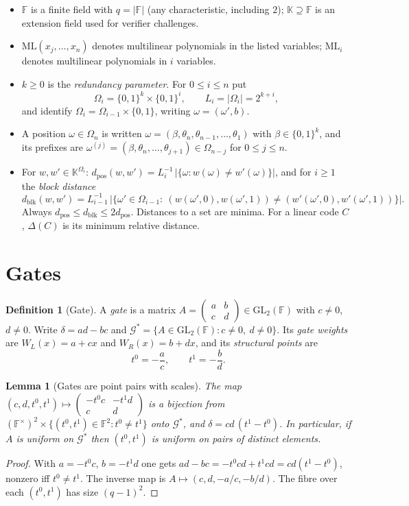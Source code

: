 \documentclass[11pt]{article}
\newtheorem{lemma}[theorem]{Lemma}
\theoremstyle{definition}
\newtheorem{definition}[theorem]{Definition}
\newcommand{\F}{\mathbb{F}}
\newcommand{\K}{\mathbb{K}}
\newcommand{\ML}{\mathrm{ML}}
\newcommand{\dpos}{d_{\mathrm{pos}}}
\newcommand{\dblk}{d_{\mathrm{blk}}}
\newcommand{\GL}{\mathrm{GL}}
\newcommand{\Gs}{\mathcal{G}^{*}}
\begin{document}
\begin{itemize}[leftmargin=*]
\item $\F$ is a finite field with $q=|\F|$ (any characteristic, including $2$); $\K\supseteq\F$ is an
extension field used for verifier challenges.
\item $\ML(x_j,\dots,x_n)$ denotes multilinear polynomials in the listed variables;
$\ML_i$ denotes multilinear polynomials in $i$ variables.
\item $k\ge 0$ is the \emph{redundancy parameter}. For $0\le i\le n$ put
\[
\Omega_i=\{0,1\}^k\times\{0,1\}^{i},\qquad L_i=|\Omega_i|=2^{k+i},
\]
and identify $\Omega_i=\Omega_{i-1}\times\{0,1\}$, writing $\omega=(\omega',b)$.
\item A position $\omega\in\Omega_n$ is written $\omega=(\beta,\theta_n,\theta_{n-1},\dots,\theta_1)$
with $\beta\in\{0,1\}^k$, and its prefixes are
$\omega^{(j)}=(\beta,\theta_n,\dots,\theta_{j+1})\in\Omega_{n-j}$ for $0\le j\le n$.
\item For $w,w'\in\K^{\Omega_i}$:
$\dpos(w,w')=L_i^{-1}\,|\{\omega:w(\omega)\neq w'(\omega)\}|$, and for $i\ge1$ the
\emph{block distance}
\[
\dblk(w,w')=L_{i-1}^{-1}\,\bigl|\{\omega'\in\Omega_{i-1}:\ (w(\omega',0),w(\omega',1))\neq(w'(\omega',0),w'(\omega',1))\}\bigr|.
\]
Always $\dpos\le\dblk\le 2\dpos$. Distances to a set are minima.
For a linear code $C$, $\Delta(C)$ is its minimum relative distance.
\end{itemize}

\section{Gates}

\begin{definition}[Gate]
A \emph{gate} is a matrix
$A=\begin{pmatrix}a&b\\c&d\end{pmatrix}\in\GL_2(\F)$ with $c\neq0$, $d\neq0$.
Write $\delta=ad-bc$ and $\Gs=\{A\in\GL_2(\F):c\neq0,\ d\neq0\}$.
Its \emph{gate weights} are $W_L(x)=a+cx$ and $W_R(x)=b+dx$, and its \emph{structural points} are
\[
t^0=-\frac{a}{c},\qquad t^1=-\frac{b}{d}.
\]
\end{definition}

\begin{lemma}[Gates are point pairs with scales]\label{lem:gate-param}
The map $(c,d,t^0,t^1)\mapsto\begin{pmatrix}-t^0c&-t^1d\\c&d\end{pmatrix}$ is a bijection from
$(\F^\times)^2\times\{(t^0,t^1)\in\F^2:t^0\neq t^1\}$ onto $\Gs$, and
$\delta=cd\,(t^1-t^0)$. In particular, if $A$ is uniform on $\Gs$ then $(t^0,t^1)$ is uniform on
pairs of distinct elements.
\end{lemma}
\begin{proof}
With $a=-t^0c$, $b=-t^1d$ one gets $ad-bc=-t^0cd+t^1cd=cd(t^1-t^0)$, nonzero iff $t^0\neq t^1$.
The inverse map is $A\mapsto(c,d,-a/c,-b/d)$. The fibre over each $(t^0,t^1)$ has size $(q-1)^2$.
\end{proof}
\end{document}
